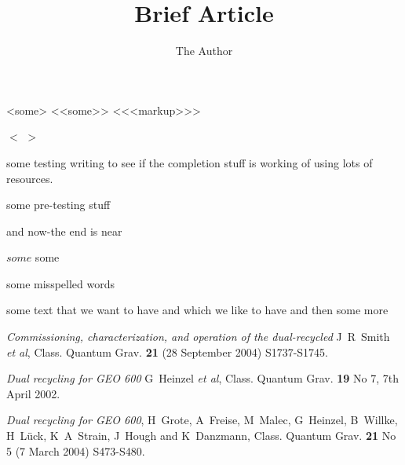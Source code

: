\documentclass[11pt]{article}
\title{Brief Article}
\author{The Author}
\date{}
\begin{document}
\maketitle

<some>
<<some>>
<<<markup>>>

$<$ $>$



some testing writing to see if the \comment completion stuff is working
of using lots of resources.


some pre-testing stuff

and now-the end is near






$some$ some

some misspelled words

some text that we want to have and which we like to have and then some more



\begin{thebibliography}{10}

	 \textit{Commissioning, characterization, and operation
	of the dual-recycled \geo} J~R~Smith \textit{et al}, Class. Quantum Grav. {\bf
  21} (28 September 2004) S1737-S1745.

   \textit{Dual recycling for GEO 600} G~Heinzel
  \textit{et al}, Class. Quantum Grav. {\bf 19} No 7, 7th April 2002.

   \textit{Dual recycling for GEO 600}, H~Grote, A~Freise,
  M~Malec, G~Heinzel, B~Willke, H~L\"uck, K~A~Strain, J~Hough and K~Danzmann,
  Class. Quantum Grav. {\bf 21} No 5 (7 March 2004) S473-S480.
\end{thebibliography}
\end{document}
